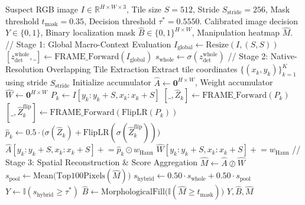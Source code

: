 \begin{algorithm}[t]
\caption{FRAME Dual-View Inpainting Detection and Localization}
\label{alg:inference}
\begin{algorithmic}[1]
\REQUIRE Suspect RGB image $I \in \mathbb{R}^{H \times W \times 3}$, Tile size $S=512$, Stride $S_{\mathrm{stride}}=256$, Mask threshold $t_{\mathrm{mask}}=0.35$, Decision threshold $\tau^*=0.5550$.
\ENSURE Calibrated image decision $Y \in \{0, 1\}$, Binary localization mask $\hat{B} \in \{0, 1\}^{H \times W}$, Manipulation heatmap $\hat{M}$.
\STATE // Stage 1: Global Macro-Context Evaluation
\STATE $I_{\mathrm{global}} \leftarrow \mathrm{Resize}(I, (S, S))$
\STATE $[z_{\mathrm{det}}^{\mathrm{whole}}, \_] \leftarrow \mathrm{FRAME\_Forward}(I_{\mathrm{global}})$
\STATE $s_{\mathrm{whole}} \leftarrow \sigma(z_{\mathrm{det}}^{\mathrm{whole}})$
\STATE // Stage 2: Native-Resolution Overlapping Tile Extraction
\STATE Extract tile coordinates $\{(x_k, y_k)\}_{k=1}^K$ using stride $S_{\mathrm{stride}}$
\STATE Initialize accumulator $\hat{A} \leftarrow \mathbf{0}^{H \times W}$, Weight accumulator $\hat{W} \leftarrow \mathbf{0}^{H \times W}$
    \STATE $P_k \leftarrow I[y_k:y_k+S, x_k:x_k+S]$
    \STATE $[\_, \hat{Z}_k] \leftarrow \mathrm{FRAME\_Forward}(P_k)$
    \STATE $[\_, \hat{Z}_k^{\mathrm{flip}}] \leftarrow \mathrm{FRAME\_Forward}(\mathrm{FlipLR}(P_k))$
    \STATE $\hat{p}_k \leftarrow 0.5 \cdot \big(\sigma(\hat{Z}_k) + \mathrm{FlipLR}(\sigma(\hat{Z}_k^{\mathrm{flip}}))\big)$
    \STATE $\hat{A}[y_k:y_k+S, x_k:x_k+S] \mathrel{+}= \hat{p}_k \odot w_{\mathrm{Hann}}$
    \STATE $\hat{W}[y_k:y_k+S, x_k:x_k+S] \mathrel{+}= w_{\mathrm{Hann}}$
\ENDFOR
\STATE // Stage 3: Spatial Reconstruction \& Score Aggregation
\STATE $\hat{M} \leftarrow \hat{A} \oslash \hat{W}$ 
\STATE $s_{\mathrm{pool}} \leftarrow \mathrm{Mean}\big(\mathrm{Top100Pixels}(\hat{M})\big)$
\STATE $s_{\mathrm{hybrid}} \leftarrow 0.50 \cdot s_{\mathrm{whole}} + 0.50 \cdot s_{\mathrm{pool}}$
\STATE $Y \leftarrow \mathbb{I}(s_{\mathrm{hybrid}} \ge \tau^*)$
\STATE $\hat{B} \leftarrow \mathrm{MorphologicalFill}\big(\mathbb{I}(\hat{M} \ge t_{\mathrm{mask}})\big)$
\RETURN $Y, \hat{B}, \hat{M}$
\end{algorithmic}
\end{algorithm}
